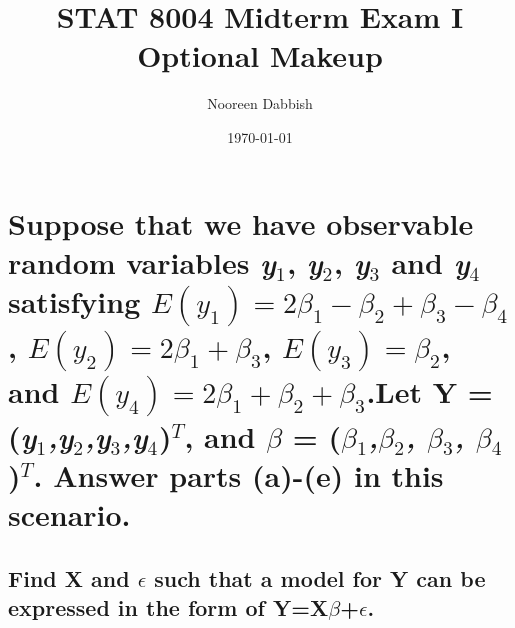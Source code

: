 \documentclass[11pt]{article}
\title{STAT 8004 Midterm Exam I Optional Makeup}
\author{Nooreen Dabbish}
\date{\today}
\begin{document}
\maketitle


\section{Suppose that we have observable random variables \emph{y$_1$}, \emph{y$_2$}, \emph{y$_3$} and \emph{y$_4$} satisfying $E(y_1) = 2\beta_1 - \beta_2 + \beta_3 - \beta_4$, $E(y_2) = 2\beta_1 + \beta_3$, $E(y_3) = \beta_2$, and $E(y_4) = 2\beta_1 + \beta_2 + \beta_3$.Let \textbf{Y} = (\emph{y$_1$,y$_2$,y$_3$,y$_4$})$^T$, and \textbf{$\beta$} = (\emph{$\beta$$_1$,$\beta$$_2$, $\beta$$_3$, $\beta$$_4$})$^T$. Answer parts (a)-(e) in this scenario.}
\label{sec-1}
\subsection{Find \textbf{X} and \textbf{$\epsilon$} such that a model for \textbf{Y} can be expressed in the form of \textbf{Y=X$\beta$+$\epsilon$}.}
\label{sec-1-1}
\end{document}
